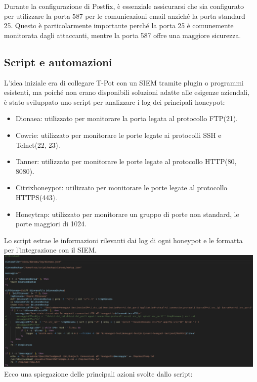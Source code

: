 \documentclass[12pt,a4paper,oneside,onecolumn,openright]{book}
\begin{document}
	Durante la configurazione di Postfix, è essenziale assicurarsi che sia configurato per utilizzare la porta 587 per le comunicazioni email anziché la porta standard 25. Questo è particolarmente importante perché la porta 25 è comunemente monitorata dagli attaccanti, mentre la porta 587 offre una maggiore sicurezza.
	
	\subsection{Script e automazioni}
	L'idea iniziale era di collegare T-Pot con un SIEM tramite plugin o programmi esistenti, ma poiché non erano disponibili soluzioni adatte alle esigenze aziendali, è stato sviluppato uno script per analizzare i log dei principali honeypot: 
	\begin{itemize}
		\item Dionaea: utilizzato per monitorare la porta legata al protocollo FTP(21).
		\item Cowrie: utilizzato per monitorare le porte legate ai protocolli SSH e Telnet(22, 23).
		\item Tanner: utilizzato per monitorare le porte legate al protocollo HTTP(80, 8080).
		\item Citrixhoneypot: utilizzato per monitorare le porte legate al protocollo HTTPS(443).
		\item Honeytrap: utilizzato per monitorare un gruppo di porte non standard, le porte maggiori di 1024.
	\end{itemize}
	Lo script estrae le informazioni rilevanti dai log di ogni honeypot e le formatta per l'integrazione con il SIEM.\\
	\includegraphics[width=\textwidth]{image/script.png}
	\newpage
	Ecco una spiegazione delle principali azioni svolte dallo script:
\end{document}

